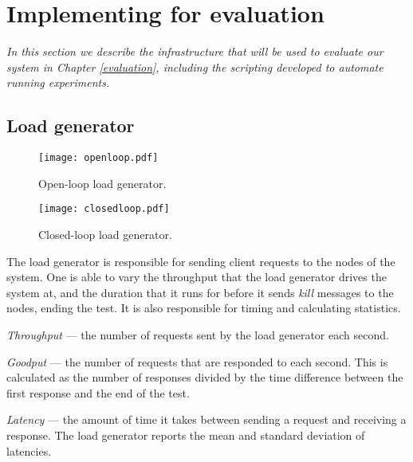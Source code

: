 
\section{Implementing for evaluation} \label{benchcode}

\textit{In this section we describe the infrastructure that will be used to evaluate our system in Chapter \ref{evaluation}, including the scripting developed to automate running experiments.}

\subsection{Load generator} \label{loadgenerator}

\begin{figure}[h]
\centering
\texttt{[image: openloop.pdf]}
\caption{Open-loop load generator.}
\label{openloop}
\end{figure}

\begin{figure}[h]
\centering
\texttt{[image: closedloop.pdf]}
\caption{Closed-loop load generator.}
\label{closedloop}
\end{figure}

The load generator is responsible for sending client requests to the nodes of the system. One is able to vary the throughput that the load generator drives the system at, and the duration that it runs for before it sends \textit{kill} messages to the nodes, ending the test. It is also responsible for timing and calculating statistics.

\begin{description}
	\item \textit{Throughput} --- the number of requests sent by the load generator each second.
	\item \textit{Goodput} --- the number of requests that are responded to each second. This is calculated as the number of responses divided by the time difference between the first response and the end of the test.
	\item \textit{Latency} --- the amount of time it takes between sending a request and receiving a response. The load generator reports the mean and standard deviation of latencies.
\end{description}

